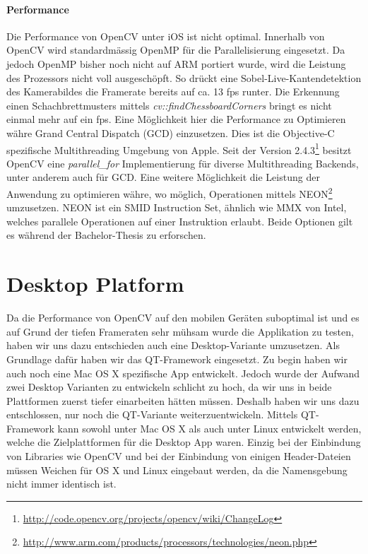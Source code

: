 \paragraph{Performance} Die Performance von OpenCV unter iOS ist nicht optimal. Innerhalb von OpenCV wird standardmässig OpenMP für die Parallelisierung eingesetzt. Da jedoch OpenMP bisher noch nicht auf ARM portiert wurde, wird die Leistung des Prozessors nicht voll ausgeschöpft. So drückt eine Sobel-Live-Kantendetektion des Kamerabildes die Framerate bereits auf ca. 13 fps runter. Die Erkennung einen Schachbrettmusters mittels \textit{cv::findChessboardCorners} bringt es nicht einmal mehr auf ein fps. Eine Möglichkeit hier die Performance zu Optimieren währe Grand Central Dispatch (GCD) einzusetzen. Dies ist die Objective-C spezifische Multithreading Umgebung von Apple. Seit der Version 2.4.3\footnote{\url{http://code.opencv.org/projects/opencv/wiki/ChangeLog}} besitzt OpenCV eine \textit{parallel\_for} Implementierung für diverse Multithreading Backends, unter anderem auch für GCD. Eine weitere Möglichkeit die Leistung der Anwendung zu optimieren währe, wo möglich, Operationen mittels NEON\footnote{\url{http://www.arm.com/products/processors/technologies/neon.php}} umzusetzen. NEON ist ein SMID Instruction Set, ähnlich wie MMX von Intel, welches parallele Operationen auf einer Instruktion erlaubt. Beide Optionen gilt es während der Bachelor-Thesis zu erforschen.

\section{Desktop Platform}
Da die Performance von OpenCV auf den mobilen Geräten suboptimal ist und es auf Grund der tiefen Frameraten sehr mühsam wurde die Applikation zu testen, haben wir uns dazu entschieden auch eine Desktop-Variante umzusetzen. Als Grundlage dafür haben wir das QT-Framework eingesetzt. Zu begin haben wir auch noch eine Mac OS X spezifische App entwickelt. Jedoch wurde der Aufwand zwei Desktop Varianten zu entwickeln schlicht zu hoch, da wir uns in beide Plattformen zuerst tiefer einarbeiten hätten müssen. Deshalb haben wir uns dazu entschlossen, nur noch die QT-Variante weiterzuentwickeln. Mittels QT-Framework kann sowohl unter Mac OS X als auch unter Linux entwickelt werden, welche die Zielplattformen für die Desktop App waren. Einzig bei der Einbindung von Libraries wie OpenCV und bei der Einbindung von einigen Header-Dateien müssen Weichen für OS X und Linux eingebaut werden, da die Namensgebung nicht immer identisch ist. 
